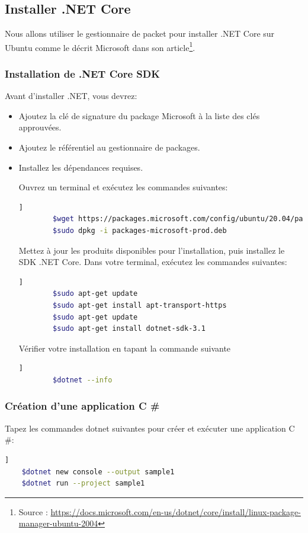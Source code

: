 	\subsection{Installer .NET Core }
	
	Nous allons utiliser le gestionnaire de packet pour installer .NET Core sur Ubuntu comme le décrit Microsoft dans son article\footnote{Source  : \url{https://docs.microsoft.com/en-us/dotnet/core/install/linux-package-manager-ubuntu-2004}}.
	
	\subsubsection{Installation de .NET Core SDK}
	Avant d'installer .NET, vous devrez:
	\begin{itemize}
		\item Ajoutez la clé de signature du package Microsoft à la liste des clés approuvées.
		\item Ajoutez le référentiel au gestionnaire de packages.
		\item Installez les dépendances requises.
		
		Ouvrez un terminal et exécutez les commandes suivantes: 
		\begin{lstlisting}[language=bash]   ]
		$wget https://packages.microsoft.com/config/ubuntu/20.04/packages-microsoft-prod.deb -O packages-microsoft-prod.deb
		$sudo dpkg -i packages-microsoft-prod.deb
		\end{lstlisting}
		
		Mettez à jour les produits disponibles pour l'installation, puis installez le SDK .NET Core. Dans votre terminal, exécutez les commandes suivantes:
		\begin{lstlisting}[language=bash]   ]
		$sudo apt-get update
		$sudo apt-get install apt-transport-https
		$sudo apt-get update
		$sudo apt-get install dotnet-sdk-3.1
		\end{lstlisting}
		
		Vérifier votre installation en tapant la commande suivante 
		
		\begin{lstlisting}[language=bash]   ]
		$dotnet --info
		\end{lstlisting}
		
		
	\end{itemize}
	
	
	\subsubsection{Création d'une application C \#}
	Tapez les commandes dotnet suivantes pour créer et exécuter une application C \#:
	\begin{lstlisting}[language=bash]   ]
	$dotnet new console --output sample1
	$dotnet run --project sample1
	\end{lstlisting}
	
